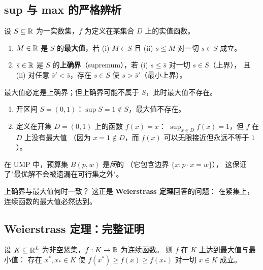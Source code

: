 \subsection{sup 与 max 的严格辨析}
\label{subsec:sup-vs-max}

设 $S\subseteq\mathbb{R}$ 为一实数集，$f$ 为定义在某集合 $D$ 上的实值函数。

\begin{definition}[上确界与最大值]\label{def:sup-max}
\begin{enumerate}
\item $M\in\mathbb{R}$ 是 $S$ 的\textbf{最大值}，若 (i) $M\in S$ 且 (ii) $s\le M$ 对一切 $s\in S$ 成立。
\item $\bar s\in\mathbb{R}$ 是 $S$ 的\textbf{上确界}（supremum），若 (i) $s\le\bar s$ 对一切 $s\in S$（上界），
  且 (ii) 对任意 $\bar s'<\bar s$，存在 $s\in S$ 使 $s>\bar s'$（最小上界）。
\end{enumerate}
最大值必定是上确界；但上确界可能不属于 $S$，此时最大值不存在。
\end{definition}

\begin{example}\label{ex:sup-not-max}
\leavevmode
\begin{enumerate}
\item 开区间 $S=(0,1)$：$\sup S=1\notin S$，最大值不存在。
\item 定义在开集 $D=(0,1)$ 上的函数 $f(x)=x$：
  $\sup_{x\in D} f(x)=1$，但 $f$ 在 $D$ 上没有最大值
  （因为 $x=1\notin D$，而 $f(x)$ 可以无限接近但永远不等于 $1$）。
\end{enumerate}
在 UMP 中，预算集 $B(p,w)$ 是\emph{闭}的
（它包含边界 $\{x:p\cdot x=w\}$），
这保证了"最优解不会被遗漏在可行集之外"。
\end{example}

上确界与最大值何时一致？
这正是 \textbf{Weierstrass 定理}回答的问题：
在紧集上，连续函数的最大值必然达到。

\subsection{Weierstrass 定理：完整证明}
\label{subsec:weierstrass}

\begin{theorem}\label{thm:weierstrass}
设 $K\subseteq\mathbb{R}^L$ 为非空紧集，$f:K\to\mathbb{R}$ 为连续函数。
则 $f$ 在 $K$ 上达到最大值与最小值：
存在 $x^*,x_*\in K$ 使 $f(x^*)\ge f(x)\ge f(x_*)$ 对一切 $x\in K$ 成立。
\end{theorem}

